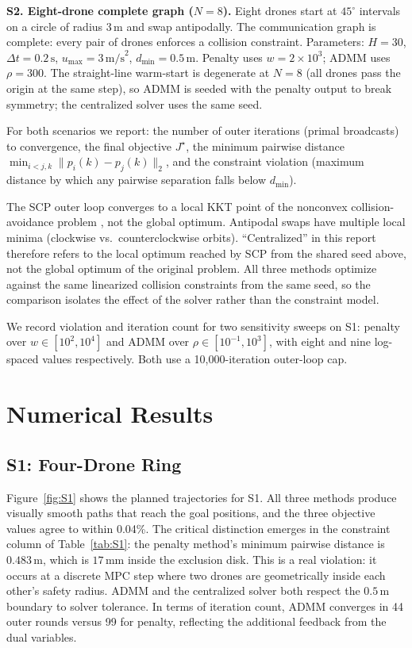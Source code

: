 \documentclass[11pt,onecolumn]{article}
\newcommand{\dmin}{d_{\min}}
\begin{document}
\textbf{S2. Eight-drone complete graph ($N=8$).}  Eight drones start at
$45^\circ$ intervals on a circle of radius 3\,m and swap antipodally.  The communication
graph is complete: every pair of drones enforces a collision constraint.
Parameters: $H=30$, $\Delta t = 0.2\,\text{s}$, $u_{\max}=3\,\text{m/s}^2$,
$\dmin=0.5\,\text{m}$.  Penalty uses $w=2\times10^3$; ADMM uses $\rho=300$.
The straight-line warm-start is degenerate at $N=8$ (all drones pass the origin at the
same step), so ADMM is seeded with the penalty output to break symmetry; the centralized
solver uses the same seed.

For both scenarios we report: the number of outer iterations (primal broadcasts) to
convergence, the final objective $J^\star$, the minimum pairwise distance
$\min_{i<j,k}\|p_i(k)-p_j(k)\|_2$, and the constraint violation (maximum distance by
which any pairwise separation falls below $\dmin$).

The SCP outer loop converges to a local KKT point of the nonconvex collision-avoidance
problem \cite{mao2016scp}, not the global optimum. Antipodal swaps have multiple
local minima (clockwise vs.\ counterclockwise orbits).  ``Centralized'' in this
report therefore refers to the local optimum reached by SCP from the shared seed
above, not the global optimum of the original problem.  All three methods optimize
against the same linearized collision constraints from the same seed, so the
comparison isolates the effect of the solver rather than the constraint model.

We record violation and iteration count for two sensitivity sweeps on S1: penalty over
$w \in [10^2, 10^4]$ and ADMM over $\rho \in [10^{-1}, 10^3]$, with eight and nine
log-spaced values respectively.  Both use a 10{,}000-iteration outer-loop cap.

\section{Numerical Results}
\label{sec:results}

\subsection{S1: Four-Drone Ring}

Figure~\ref{fig:S1} shows the planned trajectories for S1.  All three methods produce
visually smooth paths that reach the goal positions, and the three objective values agree
to within 0.04\%.  The critical distinction emerges in the constraint column of
Table~\ref{tab:S1}: the penalty method's minimum pairwise distance is $0.483\,\text{m}$,
which is $17\,\text{mm}$ inside the exclusion disk.  This is a real violation: it occurs
at a discrete MPC step where two drones are geometrically inside each other's safety
radius.  ADMM and the centralized solver both respect the $0.5\,\text{m}$ boundary to
solver tolerance.  In terms of iteration count, ADMM converges in 44 outer rounds versus
99 for penalty, reflecting the additional feedback from the dual variables.
\end{document}
